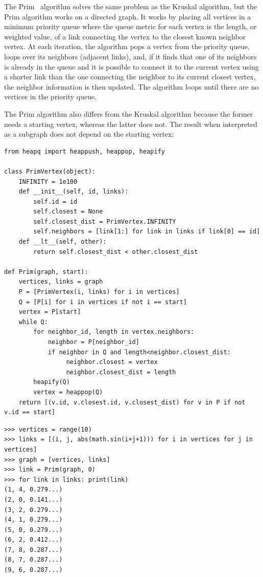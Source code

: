 \documentclass[justified, sixbynine]{tufte-book}
\def\ft{\small\tt}
\theoremstyle{plain}%
\newtheorem * {corollary}{Corollary}
\theoremstyle{definition}
\theoremstyle{remark}
\newtheorem * {remark}{Remark}
\newtheorem * {note}{Note}
\begin{document}
\begin{fullwidth}
The Prim~\cite{prim} algorithm solves the same problem as the Kruskal algorithm, but the Prim algorithm works on a directed graph. It works by placing all vertices in a minimum priority queue where the queue metric for each vertex is the length, or weighted value, of a link connecting the vertex to the closest known neighbor vertex. At each iteration, the algorithm pops a vertex from the priority queue, loops over its neighbors (adjacent links), and, if it finds that one of its neighbors is already in the queue and it is possible to connect it to the current vertex using a shorter link than the one connecting the neighbor to its current closest vertex, the neighbor information is then updated. The algorithm loops until there are no vertices in the priority queue.

The Prim algorithm also differs from the Kruskal algorithm because the former needs a starting vertex, whereas the latter does not. The result when interpreted as a subgraph does not depend on the starting vertex:

\begin{lstlisting}[caption={in file: {\ft nlib.py}}]
from heapq import heappush, heappop, heapify

class PrimVertex(object):
    INFINITY = 1e100
    def __init__(self, id, links):
        self.id = id
        self.closest = None
        self.closest_dist = PrimVertex.INFINITY
        self.neighbors = [link[1:] for link in links if link[0] == id]
    def __lt__(self, other):
        return self.closest_dist < other.closest_dist

def Prim(graph, start):
    vertices, links = graph
    P = [PrimVertex(i, links) for i in vertices]
    Q = [P[i] for i in vertices if not i == start]
    vertex = P[start]
    while Q:
        for neighbor_id, length in vertex.neighbors:
            neighbor = P[neighbor_id]
            if neighbor in Q and length<neighbor.closest_dist:
                 neighbor.closest = vertex
                 neighbor.closest_dist = length
        heapify(Q)
        vertex = heappop(Q)
    return [(v.id, v.closest.id, v.closest_dist) for v in P if not v.id == start]
\end{lstlisting}

\begin{lstlisting}
>>> vertices = range(10)
>>> links = [(i, j, abs(math.sin(i+j+1))) for i in vertices for j in vertices]
>>> graph = [vertices, links]
>>> link = Prim(graph, 0)
>>> for link in links: print(link)
(1, 4, 0.279...)
(2, 0, 0.141...)
(3, 2, 0.279...)
(4, 1, 0.279...)
(5, 0, 0.279...)
(6, 2, 0.412...)
(7, 8, 0.287...)
(8, 7, 0.287...)
(9, 6, 0.287...)
\end{lstlisting}


\end{fullwidth}
\end{document}
